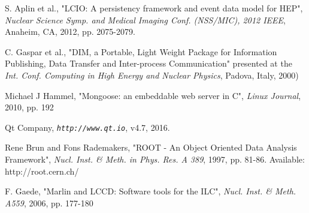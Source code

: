 \documentclass[conference]{IEEEtran}
\begin{document}

%
%
\vspace{1em}
\begin{thebibliography}{6}

S. Aplin et al., "LCIO: A persistency framework and event data model for HEP", \emph{Nuclear Science Symp. and Medical Imaging Conf. (NSS/MIC), 2012 IEEE}, Anaheim, CA, 2012, pp. 2075-2079.

C. Gaspar et al., "DIM, a Portable, Light Weight Package for Information Publishing, Data Transfer and Inter-process Communication" presented at the \emph{Int. Conf. Computing in High Energy and Nuclear Physics}, Padova, Italy, 2000)

Michael J Hammel, "Mongoose: an embeddable web server in C", \emph{Linux Journal}, 2010, pp. 192

Qt Company, \emph{\tt http://www.qt.io}, v4.7, 2016.

Rene Brun and Fons Rademakers, "ROOT - An Object Oriented Data Analysis Framework", \emph{Nucl. Inst. \& Meth. in Phys. Res. A 389}, 1997, pp. 81-86. Available: http://root.cern.ch/

F. Gaede,  "Marlin and LCCD: Software tools for the ILC", \emph{Nucl. Inst. \& Meth. A559}, 2006, pp. 177-180

\end{thebibliography}


%
\end{document}
